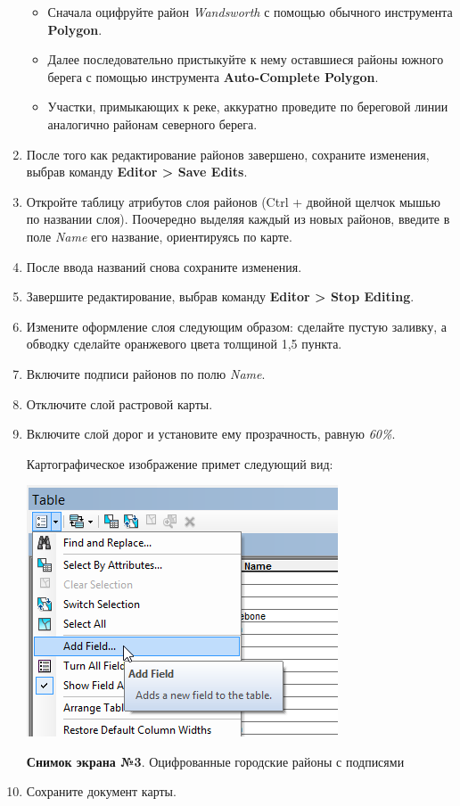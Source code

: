 \documentclass[]{book}
\theoremstyle{definition}
\theoremstyle{definition}
\theoremstyle{definition}
\theoremstyle{remark}
\begin{document}
\begin{enumerate}
  \begin{itemize}
  \item
    Сначала оцифруйте район \emph{Wandsworth} с помощью обычного
    инструмента \textbf{Polygon}.
  \item
    Далее последовательно пристыкуйте к нему оставшиеся районы южного
    берега с помощью инструмента \textbf{Auto-Complete Polygon}.
  \item
    Участки, примыкающих к реке, аккуратно проведите по береговой линии
    аналогично районам северного берега.
  \end{itemize}
\item
  После того как редактирование районов завершено, сохраните изменения,
  выбрав команду \textbf{Editor \textgreater{} Save Edits}.
\item
  Откройте таблицу атрибутов слоя районов (Ctrl + двойной щелчок мышью
  по названии слоя). Поочередно выделяя каждый из новых районов, введите
  в поле \emph{Name} его название, ориентируясь по карте.
\item
  После ввода названий снова сохраните изменения.
\item
  Завершите редактирование, выбрав команду \textbf{Editor \textgreater{}
  Stop Editing}.
\item
  Измените оформление слоя следующим образом: сделайте пустую заливку, а
  обводку сделайте оранжевого цвета толщиной 1,5 пункта.
\item
  Включите подписи районов по полю \emph{Name}.
\item
  Отключите слой растровой карты.
\item
  Включите слой дорог и установите ему прозрачность, равную \emph{60\%}.

  Картографическое изображение примет следующий вид:

  \includegraphics{images/Ex06/image14.png}

  \textbf{Снимок экрана №3}. Оцифрованные городские районы с подписями
\item
  Сохраните документ карты.
\end{enumerate}
\end{document}
